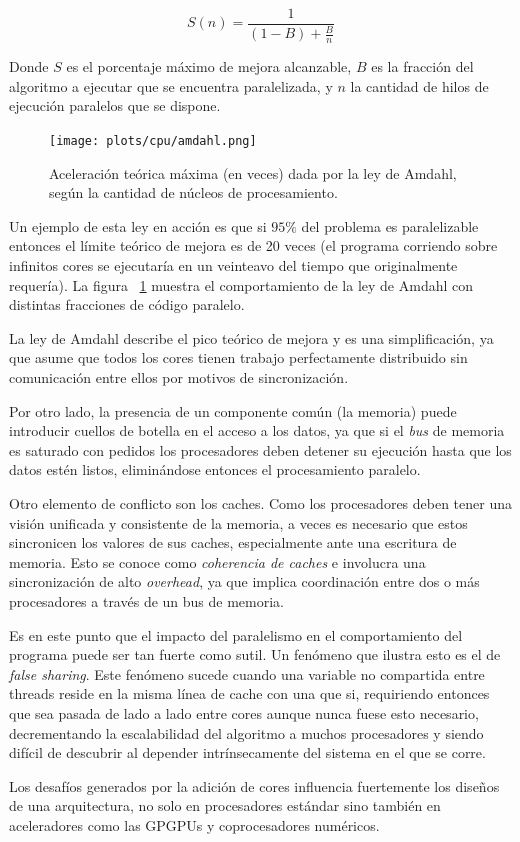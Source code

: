 \begin{equation}
    \label{eq:amdahl}
    S(n) = \frac{1}{(1 - B) + \frac{B}{n}}
\end{equation}

Donde $S$ es el porcentaje m\'aximo de mejora alcanzable, $B$ es la fracci\'on del algoritmo a ejecutar que se encuentra
paralelizada, y $n$ la cantidad de hilos de ejecuci\'on paralelos que se dispone.

\begin{figure}[htbp]
    \centering
    \texttt{[image: plots/cpu/amdahl.png]}
    \caption{Aceleraci\'on te\'orica m\'axima (en veces) dada por la ley de Amdahl, seg\'un la cantidad de n\'ucleos de procesamiento.}
    \label{fig:amdahl_plot}
\end{figure}

Un ejemplo de esta ley en acci\'on es que si $95 \%$ del problema es paralelizable entonces el l\'imite te\'orico de
mejora es de 20 veces (el programa corriendo sobre infinitos cores se ejecutar\'ia en un veinteavo del tiempo que originalmente
requer\'ia). La figura ~\ref{fig:amdahl_plot} muestra el comportamiento de la ley de Amdahl con distintas fracciones de c\'odigo
paralelo.

La ley de Amdahl describe el pico te\'orico de mejora y es una simplificaci\'on, ya que asume que todos los cores tienen
trabajo perfectamente distribuido sin comunicaci\'on entre ellos por motivos de sincronizaci\'on.

Por otro lado, la presencia de un componente com\'un (la memoria) puede introducir cuellos de botella en el acceso a los
datos, ya que si el \textit{bus} de memoria es saturado con pedidos los procesadores deben detener su ejecuci\'on hasta que
los datos est\'en listos, elimin\'andose entonces el procesamiento paralelo.

Otro elemento de conflicto son los caches. Como los procesadores deben tener una visi\'on unificada y consistente de la
memoria, a veces es necesario que estos sincronicen los valores de sus caches, especialmente ante una escritura de memoria.
Esto se conoce como \textit{coherencia de caches} e involucra una sincronizaci\'on de alto \textit{overhead}, ya
que implica coordinaci\'on entre dos o m\'as procesadores a trav\'es de un bus de memoria.

Es en este punto que el impacto del paralelismo en el comportamiento del programa puede ser tan fuerte como sutil. Un fen\'omeno que
ilustra esto es el de \textit{false sharing}. Este fen\'omeno sucede cuando una variable no compartida entre threads
reside en la misma l\'inea de cache con una que si, requiriendo entonces que sea pasada de lado a lado entre cores aunque
nunca fuese esto necesario, decrementando la escalabilidad del algoritmo a muchos procesadores y siendo
dif\'icil de descubrir al depender intr\'insecamente del sistema en el que se corre.

Los desaf\'ios generados por la adici\'on de cores influencia fuertemente los dise\~nos de una arquitectura, no solo en
procesadores est\'andar sino tambi\'en en aceleradores como las GPGPUs y coprocesadores num\'ericos.
